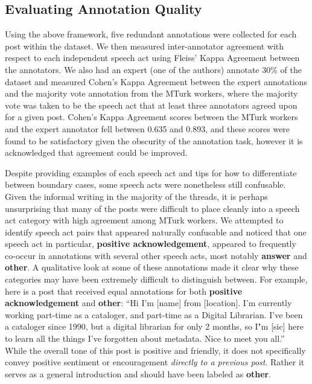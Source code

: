 \documentclass[twoside]{article}
\begin{document}
\subsection{Evaluating Annotation Quality}
Using the above framework, five redundant annotations were collected for each post within the dataset. We then measured inter-annotator agreement with respect to each independent speech act using Fleiss' Kappa Agreement between the annotators. We also had an expert (one of the authors) annotate 30\% of the dataset and measured Cohen's Kappa Agreement between the expert annotations and the majority vote annotation from the MTurk workers, where the majority vote was taken to be the speech act that at least three annotators agreed upon for a given post. Cohen's Kappa Agreement scores between the MTurk workers and the expert annotator fell between 0.635 and 0.893, and these scores were found to be satisfactory given the obscurity of the annotation task, however it is acknowledged that agreement could be improved.
\par
Despite providing examples of each speech act and tips for how to differentiate between boundary cases, some speech acts were nonetheless still confusable. Given the informal writing in the majority of the threads, it is perhaps unsurprising that many of the posts were difficult to place cleanly into a speech act category with high agreement among MTurk workers. We attempted to identify speech act pairs that appeared naturally confusable and noticed that one speech act in particular, \textbf{positive acknowledgement}, appeared to frequently co-occur in annotations with several other speech acts, most notably \textbf{answer} and \textbf{other}. A qualitative look at some of these annotations made it clear why these categories may have been extremely difficult to distinguish between. For example, here is a post that received equal annotations for both \textbf{positive acknowledgement} and \textbf{other}: ``Hi I'm [name] from [location]. I'm currently working part-time as a cataloger, and part-time as a Digital Librarian. I've been a cataloger since 1990, but a digital librarian for only 2 months, so I"m [sic] here to learn all the things I've forgotten about metadata. Nice to meet you all.'' While the overall tone of this post is positive and friendly, it does not specifically convey positive sentiment or encouragement \emph{directly to a previous post}. Rather it serves as a general introduction and should have been labeled as \textbf{other}.
\end{document}
